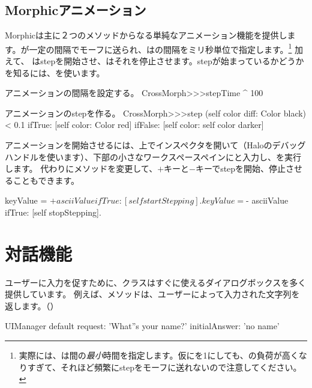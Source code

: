 \documentclass[a4paper,10pt,twoside]{book}
\begin{document}
\subsection{Morphicアニメーション}

Morphicは主に２つのメソッドからなる単純なアニメーション機能を提供します。が一定の間隔でモーフに送られ、はの間隔をミリ秒単位で指定します。\footnote{実際には、は間の\emph{最小}時間を指定します。仮にを1にしても、\pharo の負荷が高くなりすぎて、それほど頻繁にstepをモーフに送れないので注意してください。}
加えて、
はstepを開始させ、はそれを停止させます。stepが始まっているかどうかを知るには、を使います。

\begin{method}{アニメーションの間隔を設定する。}
CrossMorph>>>stepTime
	^ 100
\end{method}
\begin{method}{アニメーションのstepを作る。}
CrossMorph>>>step
	(self color diff: Color black) < 0.1
		ifTrue: [self color: Color red]
		ifFalse: [self color: self color darker]
\end{method}
\noindent
アニメーションを開始させるには、上でインスペクタを開いて（Haloのデバッグハンドル\debugHandle{}を使います）、下部の小さなワークスペースペインにと入力し、を実行します。
代わりにメソッドを変更して、$+$キーと$-$キーでstepを開始、停止させることもできます。


\begin{code}{}
	keyValue = $+ asciiValue 
		ifTrue: [self startStepping].
	keyValue = $- asciiValue
		ifTrue: [self stopStepping].
\end{code}


\section{対話機能}

ユーザーに入力を促すために、クラスはすぐに使えるダイアログボックスを多く提供しています。
例えば、メソッドは、ユーザーによって入力された文字列を返します。（）
\begin{code}{}
UIManager default request: 'What''s your name?' initialAnswer: 'no name'
\end{code}
\end{document}
